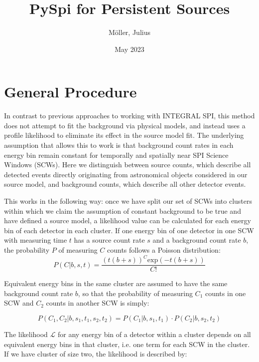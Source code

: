 \documentclass{article}
\title{PySpi for Persistent Sources}
\author{Möller, Julius}
\date{May 2023}
\begin{document}
\maketitle


\tableofcontents

\pagebreak


\section{General Procedure} \label{General Procedure}
In contrast to previous approaches to working with INTEGRAL SPI, this method does not attempt to fit the background via physical models, and instead uses a profile likelihood to eliminate its effect in the source model fit. The underlying assumption that allows this to work is that background count rates in each energy bin remain constant for temporally and spatially near SPI Science Windows (SCWs). Here we distinguish between source counts, which describe all detected events directly originating from astronomical objects considered in our source model, and background counts, which describe all other detector events.

This works in the following way: once we have split our set of SCWs into clusters within which we claim the assumption of constant background to be true and have defined a source model, a likelihood value can be calculated for each energy bin of each detector in each cluster. If one energy bin of one detector in one SCW with measuring time $t$ has a source count rate $s$ and a background count rate $b$, the probability $P$ of measuring $C$ counts follows a Poisson distribution:
\begin{equation}
    P(C \vert b, s, t) = \frac{\left( t \left( b + s \right) \right) ^C \text{exp}\left( -t \left( b+s\right)\right)}{C!}
\end{equation}

Equivalent energy bins in the same cluster are assumed to have the same background count rate $b$, so that the probability of measuring $C_1$ counts in one SCW and $C_2$ counts in another SCW is simply:

\begin{equation}
    P(C_1, C_2 \vert b, s_1, t_1, s_2, t_2) = P(C_1 \vert b, s_1, t_1) \cdot P(C_2 \vert b, s_2, t_2)
\end{equation}

The likelihood $\mathcal{L}$ for any energy bin of a detector within a cluster depends on all equivalent energy bins in that cluster, i.e. one term for each SCW in the cluster. If we have cluster of size two, the likelihood is described by:
\end{document}
